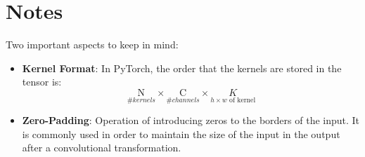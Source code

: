     \section{Notes}
    Two important aspects to keep in mind:
    \begin{itemize}
        \item \textbf{Kernel Format}: In PyTorch, the order that the kernels are stored in the tensor is:
        \begin{equation}
            \underset{\# kernels}{\mathrm{N}} \times
            \underset{\# channels}{\mathrm{C}} \times
            \underset{h \times w \text{ of kernel}}{K}
        \end{equation}

        \item \textbf{Zero-Padding}: Operation of introducing zeros to the borders of the input.
        It is commonly used in order to maintain the size of the input in the output after a convolutional transformation.
    \end{itemize}
    
